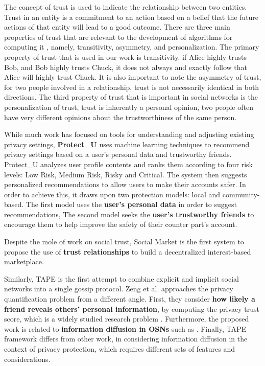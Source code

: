 The concept of trust is used to indicate the relationship between two entities.
Trust in an entity is a commitment to an action based on a belief that the future actions of that entity will lead to a good outcome.
There are three main properties of trust that are relevant to the development of algorithms for computing it \cite{wang_trustinvolved_2010},
	namely,
	transitivity,
	asymmetry,
	and personalization.
The primary property of trust that is used in our work is transitivity.
	if Alice highly trusts Bob,
	and Bob highly trusts Chuck,
	it does not always and exactly follow that Alice will highly trust Chuck.
It is also important to note the asymmetry of trust,
	for two people involved in a relationship,
	trust is not necessarily identical in both directions.
The third property of trust that is important in social networks is the personalization of trust,
	trust is inherently a personal opinion,
	two people often have very different opinions about the trustworthiness of the same person.

While much work has focused on tools for understanding and adjusting existing privacy settings,
	\textbf{Protect\_U} \cite{gandouz_protect_2012} uses machine learning techniques to recommend privacy settings based on a user’s personal data and trustworthy friends.
Protect\_U analyzes user profile contents and ranks them according to four risk levels: Low Risk, Medium Risk, Risky and Critical.
The system then suggests personalized recommendations to allow users to make their accounts safer.
In order to achieve this,
	it draws upon two protection models: local and community-based.
The first model uses the \textbf{user’s personal data} in order to suggest recommendations,
The second model seeks the \textbf{user’s trustworthy friends} to encourage them to help improve the safety of their counter part’s account.

Despite the mole of work on social trust,
	Social Market is the first system to propose the use of \textbf{trust relationships} to build a decentralized interest-based marketplace.

Similarly,
	TAPE \cite{yongbozeng_study_2015} is the first attempt to combine explicit and implicit social networks into a single gossip protocol.
Zeng et al. \cite{yongbozeng_study_2015} approaches the privacy quantification problem from a different angle.
First,
	they consider \textbf{how likely a friend reveals others’ personal information},
	by computing the privacy trust score,
	which is a widely studied research problem \cite{gundecha_exploiting_2011}.
Furthermore,
	the proposed work is related to \textbf{information diffusion in OSNs} such as \cite{fang_privacy_2010}.
Finally,
TAPE framework differs from other work,
	in considering information diffusion in the context of privacy protection,
	which requires different sets of features and considerations.


